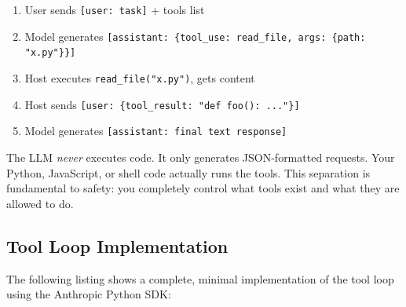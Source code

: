 \documentclass[11pt,letterpaper]{article}
\begin{document}
\begin{enumerate}[leftmargin=*]
    \item User sends \texttt{[user: task]} + tools list
    \item Model generates \texttt{[assistant: \{tool\_use: read\_file, args: \{path: "x.py"\}\}]}
    \item Host executes \texttt{read\_file("x.py")}, gets content
    \item Host sends \texttt{[user: \{tool\_result: "def foo(): ..."\}]}
    \item Model generates \texttt{[assistant: final text response]}
\end{enumerate}

\begin{notebox}
The LLM \emph{never} executes code. It only generates JSON-formatted requests. Your Python, JavaScript, or shell code actually runs the tools. This separation is fundamental to safety: you completely control what tools exist and what they are allowed to do.
\end{notebox}

\subsection{Tool Loop Implementation}

The following listing shows a complete, minimal implementation of the tool loop using the Anthropic Python SDK:
\end{document}
